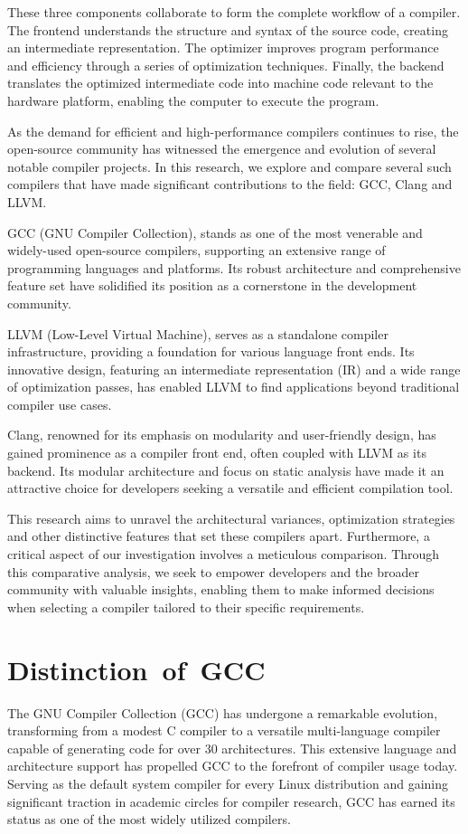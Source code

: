 \documentclass[conference]{IEEEtran}
\begin{document}
These three components collaborate to form the complete workflow of a compiler. The frontend understands the structure and syntax of the source code, creating an intermediate representation. The optimizer improves program performance and efficiency through a series of optimization techniques. Finally, the backend translates the optimized intermediate code into machine code relevant to the hardware platform, enabling the computer to execute the program.

As the demand for efficient and high-performance compilers continues to rise, the open-source community has witnessed the emergence and evolution of several notable compiler projects. In this research, we explore and compare several such compilers that have made significant contributions to the field: GCC, Clang and LLVM.

GCC (GNU Compiler Collection), stands as one of the most venerable and widely-used open-source compilers, supporting an extensive range of programming languages and platforms. Its robust architecture and comprehensive feature set have solidified its position as a cornerstone in the development community.

LLVM (Low-Level Virtual Machine), serves as a standalone compiler infrastructure, providing a foundation for various language front ends. Its innovative design, featuring an intermediate representation (IR) and a wide range of optimization passes, has enabled LLVM to find applications beyond traditional compiler use cases.

Clang, renowned for its emphasis on modularity and user-friendly design, has gained prominence as a compiler front end, often coupled with LLVM as its backend. Its modular architecture and focus on static analysis have made it an attractive choice for developers seeking a versatile and efficient compilation tool.

This research aims to unravel the architectural variances, optimization strategies and other distinctive features that set these compilers apart. Furthermore, a critical aspect of our investigation involves a meticulous comparison. Through this comparative analysis, we seek to empower developers and the broader community with valuable insights, enabling them to make informed decisions when selecting a compiler tailored to their specific requirements.

\section{Distinction of GCC}
The GNU Compiler Collection (GCC) has undergone a remarkable evolution, transforming from a modest C compiler to a versatile multi-language compiler capable of generating code for over 30 architectures. This extensive language and architecture support has propelled GCC to the forefront of compiler usage today. Serving as the default system compiler for every Linux distribution and gaining significant traction in academic circles for compiler research, GCC has earned its status as one of the most widely utilized compilers.
\end{document}
